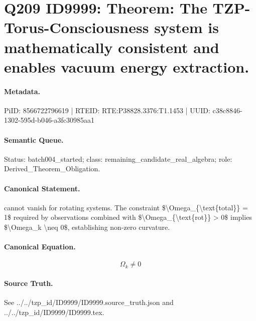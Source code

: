 \section*{Q209 ID9999: Theorem: The TZP-Torus-Consciousness system is mathematically consistent and enables vacuum energy extraction.}
\paragraph{Metadata.}
PiID: 8566722796619 | RTEID: RTE:P38828.3376:T1.1453 | UUID: c38c8846-1302-595d-b046-a3fc30985aa1

\paragraph{Semantic Queue.}
Status: batch004\_started; class: remaining\_candidate\_real\_algebra; role: Derived\_Theorem\_Obligation.

\paragraph{Canonical Statement.}
cannot vanish for rotating systems. The constraint \$\textbackslash{}Omega\_\{\textbackslash{}text\{total\}\} = 1\$ required by observations combined with \$\textbackslash{}Omega\_\{\textbackslash{}text\{rot\}\} > 0\$ implies \$\textbackslash{}Omega\_k \textbackslash{}neq 0\$, establishing non-zero curvature.

\paragraph{Canonical Equation.}
\[
\Omega_k \neq 0
\]

\paragraph{Source Truth.}
See ../../tzp\_id/ID9999/ID9999.source\_truth.json and ../../tzp\_id/ID9999/ID9999.tex.
